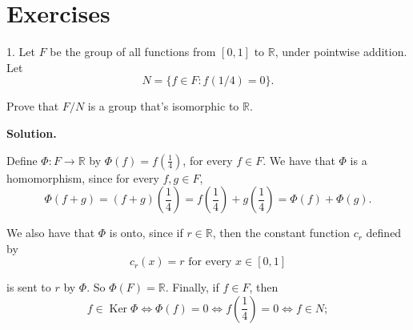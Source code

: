 \documentclass[10pt,]{book}
\theoremstyle{plain}
\theoremstyle{definition}
\theoremstyle{definition}
\theoremstyle{definition}
\theoremstyle{definition}
\numberwithin{equation}{section}
\def\R{\mathbb{R}}
\DeclareMathOperator{\Ker}{Ker}
\begin{document}
\section[{Exercises}]{Exercises}\label{exercises-9}
\begin{exerciselist}
\item[1.]\hypertarget{exercise-59}{}
        Let \(F\) be the group of all functions from \([0,1]\) to
        \(\R\), under pointwise addition. Let
\begin{equation*}

          N=\{f\in F:
          f(1/4)=0\}.
        
\end{equation*}

\par

        Prove that \(F/N\) is a group that's
        isomorphic to \(\R\).
\par\smallskip
\par\smallskip
\noindent\textbf{Solution.}\hypertarget{solution-59}{}\quad

      Define \(\Phi:F\rightarrow \R\) by
      \(\Phi(f)=f\left(\frac{1}{4}\right)\), for every \(f\in F\). We have
      that \(\Phi\) is a homomorphism, since for every \(f, g\in F\),
\begin{equation*}

        \Phi(f+g)=(f+g)\left(\frac{1}{4}\right)=f\left(\frac{1}{4}\right)+g\left(\frac{1}{4}\right)=\Phi(f)+\Phi(g).
      
\end{equation*}

\par

      We also have that \(\Phi\) is onto, since if \(r\in \R\), then the
      constant function \(c_r\) defined by
\begin{equation*}

        c_r(x)=r \mbox{ for every \(x\in
        [0,1]\)}
      
\end{equation*}

      is sent to \(r\) by \(\Phi\). So \(\Phi(F)=\R\). Finally, if
      \(f\in F\), then
\begin{equation*}

        f\in \Ker \Phi \Leftrightarrow \Phi(f)=0 \Leftrightarrow
        f\left(\frac{1}{4}\right)=0 \Leftrightarrow f\in N;
      
\end{equation*}


\end{exerciselist}
\end{document}
